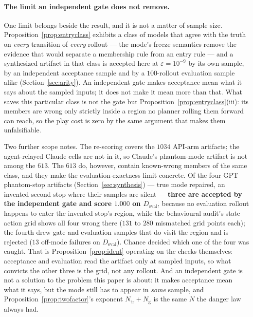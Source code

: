 \documentclass[11pt]{article}
\theoremstyle{definition}
\theoremstyle{remark}
\begin{document}
\paragraph{The limit an independent gate does not remove.} One limit belongs beside the result, and it is not a matter of sample size. Proposition~\ref{prop:entryclass} exhibits a class of models that agree with the truth on \emph{every} transition of \emph{every} rollout --- the mode's freeze semantics remove the evidence that would separate a membership rule from an entry rule --- and a synthesized artifact in that class is accepted here at $\varepsilon = 10^{-9}$ by its own sample, by an independent acceptance sample and by a $100$-rollout evaluation sample alike (Section~\ref{sec:arity}). An independent gate makes acceptance mean what it says about the sampled inputs; it does not make it mean more than that. What saves this particular class is not the gate but Proposition~\ref{prop:entryclass}(iii): its members are wrong only strictly inside a region no planner rolling them forward can reach, so the play cost is zero by the same argument that makes them unfalsifiable.

Two further scope notes. The re-scoring covers the $1034$ API-arm artifacts; the agent-relayed Claude cells are not in it, so Claude's phantom-mode artifact is not among the $613$. The $613$ do, however, contain known-wrong members of the same class, and they make the evaluation-exactness limit concrete. Of the four GPT phantom-stop artifacts (Section~\ref{sec:synthesis}) --- true mode repaired, an invented second stop where their samples are silent --- \textbf{three are accepted by the independent gate and score $1.000$ on $D_{\mathrm{eval}}$}, because no evaluation rollout happens to enter the invented stop's region, while the behavioural audit's state--action grid shows all four wrong there ($131$ to $280$ mismatched grid points each); the fourth drew gate and evaluation samples that do visit the region and is rejected ($13$ off-mode failures on $D_{\mathrm{eval}}$). Chance decided which one of the four was caught. That is Proposition~\ref{prop:ident} operating on the checks themselves: acceptance and evaluation read the artifact only at sampled inputs, so what convicts the other three is the grid, not any rollout. And an independent gate is not a solution to the problem this paper is about: it makes acceptance mean what it says, but the mode still has to appear in \emph{some} sample, and Proposition~\ref{prop:twofactor}'s exponent $N_{\mathrm{tr}} + N_{\mathrm{g}}$ is the same $N$ the danger law always had.
\end{document}
